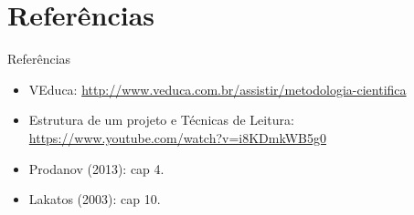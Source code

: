 \documentclass{beamer}
\begin{document}
\section{Referências}

\begin{frame}{Referências}
  \begin{itemize}
  \item<1-> VEduca:
    \url{http://www.veduca.com.br/assistir/metodologia-cientifica}
  \item<1-> Estrutura de um projeto e Técnicas de Leitura:
    \url{https://www.youtube.com/watch?v=i8KDmkWB5g0}
  \item<1-> Prodanov (2013): cap 4.
  \item<1-> Lakatos (2003): cap 10.
  \end{itemize}
\end{frame}
\end{document}
